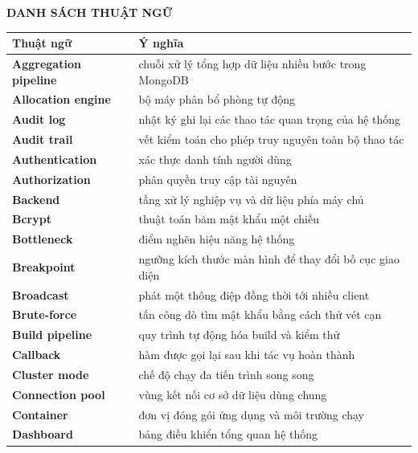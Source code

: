\documentclass[../DoAn.tex]{subfiles}
\begin{document}
\begin{center}
    {\bfseries\fontsize{18pt}{22pt}\selectfont
        DANH SÁCH THUẬT NGỮ}
\end{center}
\vspace{1cm}

\begin{longtable}{p{4.2cm} p{10.3cm}}
    \hline
    \textbf{Thuật ngữ} & \textbf{Ý nghĩa} \\
    \hline
    \endhead
    \textbf{Aggregation pipeline} & chuỗi xử lý tổng hợp dữ liệu nhiều bước trong MongoDB \\
    \textbf{Allocation engine}    & bộ máy phân bổ phòng tự động \\
    \textbf{Audit log}            & nhật ký ghi lại các thao tác quan trọng của hệ thống \\
    \textbf{Audit trail}          & vết kiểm toán cho phép truy nguyên toàn bộ thao tác \\
    \textbf{Authentication}       & xác thực danh tính người dùng \\
    \textbf{Authorization}        & phân quyền truy cập tài nguyên \\
    \textbf{Backend}              & tầng xử lý nghiệp vụ và dữ liệu phía máy chủ \\
    \textbf{Bcrypt}               & thuật toán băm mật khẩu một chiều \\
    \textbf{Bottleneck}           & điểm nghẽn hiệu năng hệ thống \\
    \textbf{Breakpoint}           & ngưỡng kích thước màn hình để thay đổi bố cục giao diện \\
    \textbf{Broadcast}            & phát một thông điệp đồng thời tới nhiều client \\
    \textbf{Brute-force}          & tấn công dò tìm mật khẩu bằng cách thử vét cạn \\
    \textbf{Build pipeline}       & quy trình tự động hóa build và kiểm thử \\
    \textbf{Callback}             & hàm được gọi lại sau khi tác vụ hoàn thành \\
    \textbf{Cluster mode}         & chế độ chạy đa tiến trình song song \\
    \textbf{Connection pool}      & vùng kết nối cơ sở dữ liệu dùng chung \\
    \textbf{Container}            & đơn vị đóng gói ứng dụng và môi trường chạy \\
    \textbf{Dashboard}            & bảng điều khiển tổng quan hệ thống \\

\end{longtable}
\end{document}
